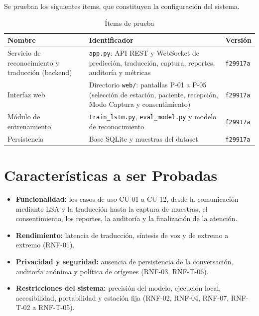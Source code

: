 \documentclass[12pt, a4paper]{article}
\begin{document}
Se prueban los siguientes ítems, que constituyen la configuración del sistema.

\begin{table}[H]
    \centering
    \caption{Ítems de prueba}
    \small
    \begin{tabularx}{\textwidth}{>{\raggedright\arraybackslash}p{4.4cm} X >{\raggedright\arraybackslash}p{2cm}}
        \toprule
        \textbf{Nombre} & \textbf{Identificador} & \textbf{Versión} \\
        \midrule
        Servicio de reconocimiento y traducción (backend) & \texttt{app.py}: API REST y WebSocket de predicción, traducción, captura, reportes, auditoría y métricas & \texttt{f29917a} \\
        Interfaz web & Directorio \texttt{web/}: pantallas P-01 a P-05 (selección de estación, paciente, recepción, Modo Captura y consentimiento) & \texttt{f29917a} \\
        Módulo de entrenamiento & \texttt{train\_lstm.py}, \texttt{eval\_model.py} y modelo de reconocimiento & \texttt{f29917a} \\
        Persistencia & Base SQLite y muestras del dataset & \texttt{f29917a} \\
        \bottomrule
    \end{tabularx}
\end{table}

\section{Características a ser Probadas}

\begin{itemize}
    \item \textbf{Funcionalidad:} los casos de uso CU-01 a CU-12, desde la comunicación mediante LSA y la traducción hasta la captura de muestras, el consentimiento, los reportes, la auditoría y la finalización de la atención.
    \item \textbf{Rendimiento:} latencia de traducción, síntesis de voz y de extremo a extremo (RNF-01).
    \item \textbf{Privacidad y seguridad:} ausencia de persistencia de la conversación, auditoría anónima y política de orígenes (RNF-03, RNF-T-06).
    \item \textbf{Restricciones del sistema:} precisión del modelo, ejecución local, accesibilidad, portabilidad y estación fija (RNF-02, RNF-04, RNF-07, RNF-T-02 a RNF-T-05).
\end{itemize}
\end{document}
